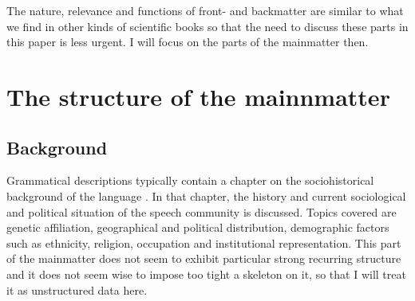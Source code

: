 \documentclass[a4paper,12pt]{article}
\begin{document}
The nature, relevance and functions of front- and backmatter are similar to what we find in other kinds of scientific books \citep{Mosel2006craft} so that the need to discuss these parts in this paper is less urgent. I will focus on the parts of the mainmatter then.

\section{The structure of the mainnmatter}
\subsection{Background}
Grammatical descriptions typically contain a chapter on the sociohistorical background of the language \citep{Lehmann2002}. In that chapter, the history and current sociological and political situation of the speech community is discussed. Topics covered are genetic affiliation, geographical and political distribution, demographic factors such as ethnicity, religion, occupation and institutional representation. This part of the mainmatter does not seem to exhibit particular strong recurring structure and it does not seem wise to impose too tight a skeleton on it, so that I will treat it as unstructured data here.
\end{document}
